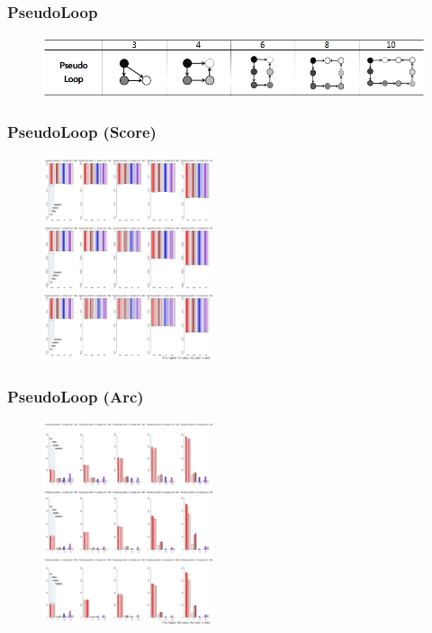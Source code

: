\documentclass{beamer}
\begin{document}
\begin{frame}
\frametitle{PseudoLoop}
{\scriptsize{}
	\begin{figure}
		\includegraphics[height=50pt]{images/Topologies_PseudoLoop}
	\end{figure}	
}
\end{frame}



\begin{frame}
\frametitle{PseudoLoop (Score)}
{\scriptsize{}
	\begin{figure}
		\includegraphics[height=170pt]{images/04_PseudoLoop_Score}
	\end{figure}	
}
\end{frame}


\begin{frame}
\frametitle{PseudoLoop (Arc)}
{\scriptsize{}
	\begin{figure}
		\includegraphics[height=170pt]{images/04_PseudoLoop_Arcs}
	\end{figure}	
}
\end{frame}
\end{document}
